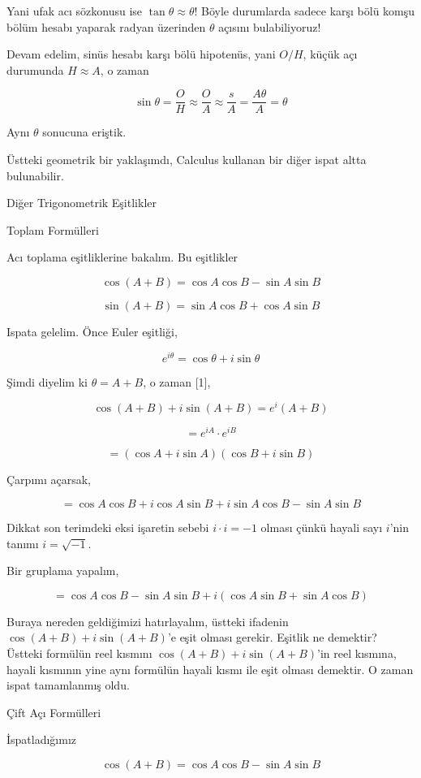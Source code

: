\documentclass[12pt,fleqn]{article}\usepackage{../../common}
\begin{document}
Yani ufak acı sözkonusu ise $\tan \theta \approx \theta$! Böyle durumlarda
sadece karşı bölü komşu bölüm hesabı yaparak radyan üzerinden $\theta$
açısını bulabiliyoruz!

Devam edelim, sinüs hesabı karşı bölü hipotenüs, yani $O / H$, küçük açı
durumunda $H \approx A$, o zaman

$$
\sin \theta = \frac{O}{H} \approx \frac{O}{A} \approx \frac{s}{A} = \frac{A\theta}{A} = \theta
$$

Aynı $\theta$ sonucuna eriştik. 

Üstteki geometrik bir yaklaşımdı, Calculus kullanan bir diğer ispat altta
bulunabilir.

Diğer Trigonometrik Eşitlikler

Toplam Formülleri

Acı toplama eşitliklerine bakalım. Bu eşitlikler

$$
\cos(A+B) = \cos A \cos B - \sin A \sin B
$$

$$
\sin(A+B) = \sin A \cos B + \cos A \sin B
$$

Ispata gelelim. Önce Euler eşitliği,

$$
e^{i\theta} = \cos\theta + i\sin\theta
$$

Şimdi diyelim ki $\theta = A+B$, o zaman [1],

$$
\cos(A+B) + i\sin(A+B) = e^i(A+B)
$$

$$
= e^{iA} \cdot e^{iB}
$$

$$
= (\cos A + i\sin A) (\cos B + i\sin B)
$$

Çarpımı açarsak,

$$
= \cos A \cos B + i\cos A \sin B +
i\sin A \cos B - \sin A \sin B
$$

Dikkat son terimdeki eksi işaretin sebebi $i \cdot i = -1$ olması çünkü hayali
sayı $i$'nin tanımı $i = \sqrt{-1}$. 

Bir gruplama yapalım, 

$$
= \cos A \cos B - \sin A \sin B + i (\cos A \sin B + \sin A \cos B )
$$

Buraya nereden geldiğimizi hatırlayalım, üstteki ifadenin $\cos(A+B) + i\sin(A+B)$'e
eşit olması gerekir. Eşitlik ne demektir? Üstteki formülün reel kısmını
$\cos(A+B) + i\sin(A+B)$'in reel kısmına, hayali kısmının yine aynı formülün
hayali kısmı ile eşit olması demektir. O zaman ispat tamamlanmış oldu.

Çift Açı Formülleri

İspatladığımız

$$
\cos(A+B) = \cos A \cos B - \sin A \sin B
$$
\end{document}
